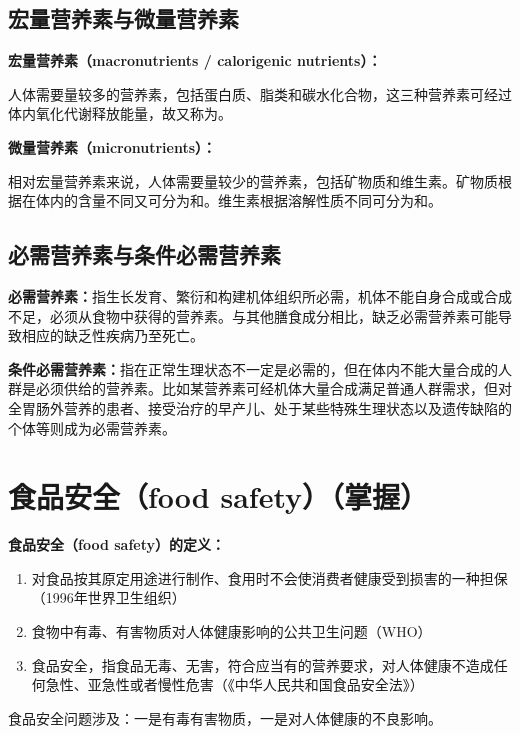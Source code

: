 \subsection{宏量营养素与微量营养素}

\begin{keybox}
\textbf{宏量营养素（macronutrients / calorigenic nutrients）：}

人体需要量较多的营养素，包括蛋白质、脂类和碳水化合物，这三种营养素可经过体内氧化代谢释放能量，故又称为。

\textbf{微量营养素（micronutrients）：}

相对宏量营养素来说，人体需要量较少的营养素，包括矿物质和维生素。矿物质根据在体内的含量不同又可分为和。维生素根据溶解性质不同可分为和。
\end{keybox}

\subsection{必需营养素与条件必需营养素}

\begin{defbox}
\textbf{必需营养素：}指生长发育、繁衍和构建机体组织所必需，机体不能自身合成或合成不足，必须从食物中获得的营养素。与其他膳食成分相比，缺乏必需营养素可能导致相应的缺乏性疾病乃至死亡。

\textbf{条件必需营养素：}指在正常生理状态不一定是必需的，但在体内不能大量合成的人群是必须供给的营养素。比如某营养素可经机体大量合成满足普通人群需求，但对全胃肠外营养的患者、接受治疗的早产儿、处于某些特殊生理状态以及遗传缺陷的个体等则成为必需营养素。
\end{defbox}

\section{食品安全（food safety）（掌握）}

\begin{keybox}
\textbf{食品安全（food safety）的定义：}

\begin{enumerate}[leftmargin=*]
    \item 对食品按其原定用途进行制作、食用时不会使消费者健康受到损害的一种担保（1996年世界卫生组织）
    \item 食物中有毒、有害物质对人体健康影响的公共卫生问题（WHO）
    \item 食品安全，指食品无毒、无害，符合应当有的营养要求，对人体健康不造成任何急性、亚急性或者慢性危害（《中华人民共和国食品安全法》）
\end{enumerate}

食品安全问题涉及：一是有毒有害物质，一是对人体健康的不良影响。
\end{keybox}

